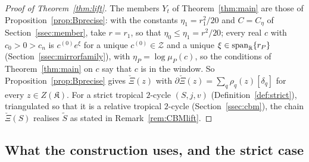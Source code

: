 \begin{proof}[Proof of Theorem~\ref{thm:lift}]
The members $Y_t$ of Theorem~\ref{thm:main} are those of Proposition~\ref{prop:Bprecise}: with the constants
$\eta_1=r_1^2/20$ and $C=C_\eta$ of Section~\ref{ssec:member}, take $r=r_1$, so that $\eta_0\le\eta_1=r^2/20$; every real $c$
with $c_0>0>c_n$ is $c^{(0)}e^\xi$ for a unique $c^{(0)}\in\mathcal Z$ and a unique $\xi\in\operatorname{span}_\mathbb R\{r_P\}$
(Section~\ref{ssec:mirrorfamily}), with $\eta_P=\log\mu_P(c)$, so the conditions of Theorem~\ref{thm:main} on $c$ say that
$c$ is in the window. So Proposition~\ref{prop:Bprecise} gives $\check\Xi(z)$ with
$\partial\check\Xi(z)=\sum_q\rho_q(z)[\delta_q]$ for every $z\in Z(\mathfrak K)$. For a strict tropical $2$-cycle $(S,j,v)$
(Definition~\ref{def:strict}), triangulated so that it is a relative tropical $2$-cycle (Section~\ref{ssec:cbm}), the chain
$\check\Xi(S)$ realises $\widetilde S$ as stated in Remark~\ref{rem:CBMlift}.
\end{proof}

\subsection{What the construction uses, and the strict case}\label{ssec:lift-cbm}

